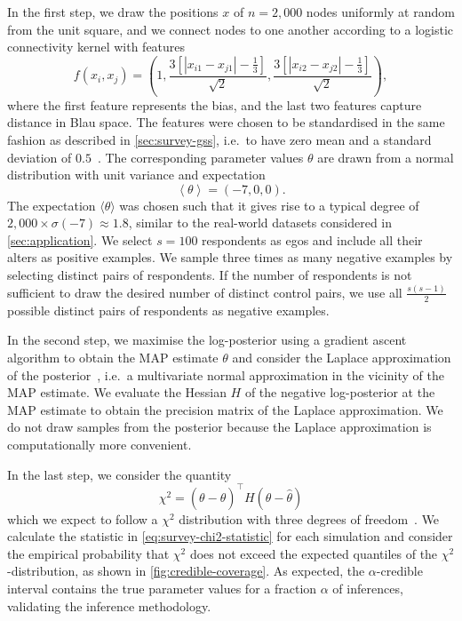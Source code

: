 \documentclass{scrartcl}
\newcommand{\expit}{\sigma}
\newcommand{\transpose}[1]{#1^\intercal}
\newcommand{\abs}[1]{\left|#1\right|}
\begin{document}
\begin{refsection}
In the first step, we draw the positions $x$ of $n=2,000$ nodes uniformly at random from the unit square, and we connect nodes to one another according to a logistic connectivity kernel with features
\begin{equation*}
    f(x_i, x_j) = \left(1, \frac{3 \left[\abs{x_{i1}-x_{j1}} - \frac{1}{3}\right]}{\sqrt{2}}, \frac{3 \left[\abs{x_{i2}-x_{j2}} - \frac{1}{3}\right]}{\sqrt{2}}\right),
\end{equation*}
where the first feature represents the bias, and the last two features capture distance in Blau space. The features were chosen to be standardised in the same fashion as described in \cref{sec:survey-gss}, i.e.\ to have zero mean and a standard deviation of $0.5$~\cite{Gelman2008a}. The corresponding parameter values $\theta$ are drawn from a normal distribution with unit variance and expectation
\begin{equation*}
    \left\langle \theta\right\rangle = \left(-7, 0, 0\right).
\end{equation*}
The expectation $\langle\theta\rangle$ was chosen such that it gives rise to a typical degree of $2,000 \times \expit(-7)\approx 1.8$, similar to the real-world datasets considered in \cref{sec:application}. We select $s=100$ respondents as egos and include all their alters as positive examples. We sample three times as many negative examples by selecting distinct pairs of respondents. If the number of respondents is not sufficient to draw the desired number of distinct control pairs, we use all $\frac{s(s-1)}{2}$ possible distinct pairs of respondents as negative examples.

In the second step, we maximise the log-posterior using a gradient ascent algorithm to obtain the MAP estimate $\theta$ and consider the Laplace approximation of the posterior~\cite[section~4.4]{Bishop2007}, i.e.\ a multivariate normal approximation in the vicinity of the MAP estimate. We evaluate the Hessian $H$ of the negative log-posterior at the MAP estimate to obtain the precision matrix of the Laplace approximation. We do not draw samples from the posterior because the Laplace approximation is computationally more convenient.

In the last step, we consider the quantity
\begin{equation}
   \chi^2 = \transpose{\left(\theta-\hat\theta\right)}H\left(\theta-\hat\theta\right)\label{eq:survey-chi2-statistic}
\end{equation}
which we expect to follow a $\chi^2$ distribution with three degrees of freedom~\cite{Slotani1964}. We calculate the statistic in \cref{eq:survey-chi2-statistic} for each simulation and consider the empirical probability that $\chi^2$ does not exceed the expected quantiles of the $\chi^2$-distribution, as shown in \cref{fig:credible-coverage}. As expected, the $\alpha$-credible interval contains the true parameter values for a fraction $\alpha$ of inferences, validating the inference methodology.


\end{refsection}
\end{document}
